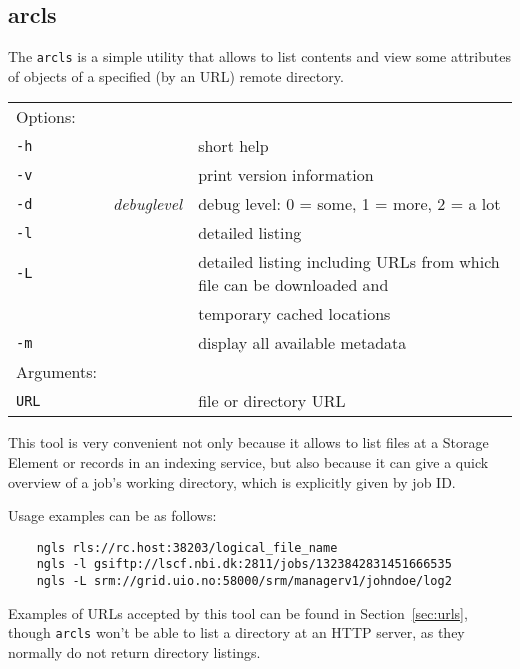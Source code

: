 \subsection{arcls}\label{sec:arcls}
The \texttt{arcls}  is a simple
utility that allows to list contents and view some attributes of
objects of a specified (by an URL) remote directory.

\hspace*{0.5cm}
\begin{shaded}
\end{shaded}
\begin{longtable}{llp{8cm}}
    Options:&&\\
    \texttt{-h} && short help\\
    \texttt{-v} && print version information\\
    \texttt{-d} & \textit{debuglevel} &debug level: 0 = some, 1 = more, 2 = a lot \\
    \texttt{-l} &  & detailed listing\\
    \texttt{-L} &  & detailed listing including URLs from which file can 
    be downloaded and\\ & & temporary cached locations\\
    \texttt{-m} && display all available metadata\\
    Arguments:&&\\
    \texttt{URL} && file or directory URL\\
\end{longtable}

This tool is very convenient not only because it allows to list files
at a Storage Element or records in an indexing service, but also
because it can give a quick overview of a job's working directory,
which is explicitly given by job ID.

Usage examples can be as follows:

\begin{verbatim}
    ngls rls://rc.host:38203/logical_file_name
    ngls -l gsiftp://lscf.nbi.dk:2811/jobs/1323842831451666535
    ngls -L srm://grid.uio.no:58000/srm/managerv1/johndoe/log2
\end{verbatim}

Examples of URLs accepted by this tool can be found in
Section~\ref{sec:urls}, though \texttt{arcls} won't be able to list a
directory at an HTTP server, as they normally do not return directory
listings.

